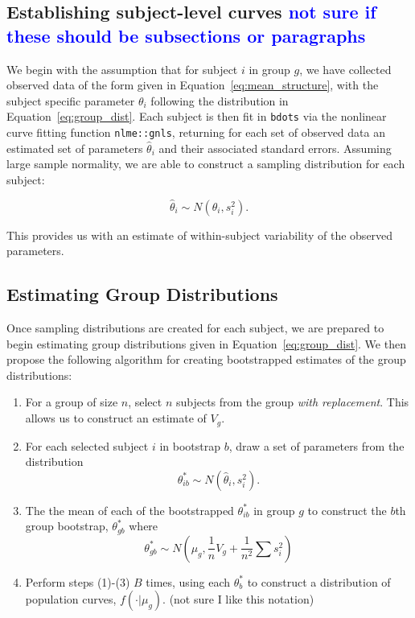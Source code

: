 \documentclass{article}
\providecommand{\cn}[1]{\textcolor{blue}{#1}}
\newcommand{\xt}{\texttt}%
\begin{document}
\subsection{Establishing subject-level curves \cn{not sure if these should be subsections or paragraphs}}

We begin with the assumption that for subject $i$ in group $g$, we have collected observed data of the form given in Equation~\ref{eq:mean_structure}, with the subject specific parameter $\theta_i$ following the distribution in Equation~\ref{eq:group_dist}. Each subject is then fit in \xt{bdots} via the nonlinear curve fitting function \xt{nlme::gnls}, returning for each set of observed data an estimated set of parameters $\hat{\theta}_i$ and their associated standard errors. Assuming large sample normality, we are able to construct a sampling distribution for each subject:

\begin{equation}\label{eq:sub_dist}
\hat{\theta}_i \sim N(\theta_i, s_i^2).
\end{equation}

This provides us with an estimate of within-subject variability of the observed parameters. 


\subsection{Estimating Group Distributions}\label{sec:group_dist}

Once sampling distributions are created for each subject, we are prepared to begin estimating group distributions given in Equation~\ref{eq:group_dist}. We then propose the following algorithm for creating bootstrapped estimates of the group distributions:


\begin{enumerate}
\item For a group of size $n$, select $n$ subjects from the group \textit{with replacement}. This allows us to construct an estimate of $V_{g}$.
\item For each selected subject $i$ in bootstrap $b$, draw a set of parameters from the distribution 
\begin{equation}
\theta_{ib}^* \sim N(\hat{\theta}_i, s_i^2).
\end{equation}
\item The the mean of each of the bootstrapped $\theta_{ib}^*$ in group $g$ to construct the $b$th group bootstrap, $\theta_{gb}^*$ where
\begin{equation}\label{eq:het_boot_dist}
\theta_{gb}^* \sim N \left(\mu_g, \frac{1}{n} V_g + \frac{1}{n^2} \sum s_i^2 \right)
\end{equation}
\item Perform steps (1)-(3) $B$ times, using each $\theta_b^*$ to construct a distribution of population curves, $f(\cdot| \mu_g)$. (not sure I like this notation)
\end{enumerate}
\end{document}
